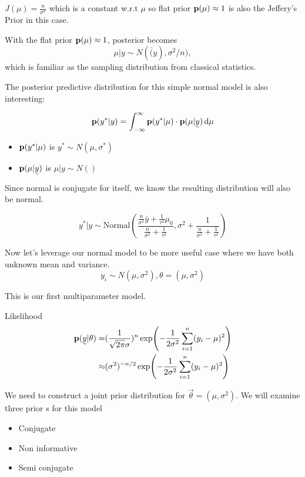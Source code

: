 $J(\mu) = \frac{n}{\sigma^2}$ which is a constant w.r.t $\mu$ so flat prior ${\mathbf p}(\mu) \approx 1$ is also the Jeffery's Prior in this case.

With the flat prior ${\mathbf p}(\mu) \approx 1$, posterior becomes
\[
\mu | y \sim N(\bar(y), \sigma^2/n),
\]
which is familiar as the sampling distribution from classical statistics.

The posterior predictive distribution for this simple normal model is also interesting:

\[
\p(y^*| y) = \int_{-\infty}^{\infty} \p(y^*| \mu) \cdot \p(\mu| \vec{y}) \diff \mu 
\]

\begin{itemize}
    \item ${\mathbf p}(y^*| \mu)$ is $y^* \sim N(\mu, \sigma^*)$
    \item $\p(\mu| \vec{y})$ is $\mu|y \sim N()$
\end{itemize}

Since normal is conjugate for itself, we know the resulting distribution will also be normal.

\[
y^*|y \sim \text{Normal}(
\frac{\frac{n}{\sigma^2} \bar{y} + \frac{1}{\tau^2} \mu_0}{ \frac{n}{\sigma^2} + \frac{1}{\tau^2}},
\sigma^2 + \frac{1}{\frac{n}{\sigma^2} + \frac{1}{\tau^2}})
\]

Now let's leverage our normal model to be more useful case where we have both unknown mean and variance.
\[
y_i \sim N(\mu, \sigma^2), \theta = (\mu, \sigma^2)
\]

This is our first multiparameter model.

Likelihood
\begin{align*}
    \p(\vec{y}| \theta) 
    =& (\frac{1}{\sqrt{2\pi}\sigma})^n \exp(-\frac{1}{2\sigma^2} \sum_{i=1}^n(y_i - \mu)^2)\\
    \approx& (\sigma^2)^{-n/2} \exp(-\frac{1}{2\sigma^2} \sum_{i=1}^n(y_i - \mu)^2)
\end{align*}

We need to construct a joint prior distribution for $\vec{\theta} = (\mu, \sigma^2)$. We will examine three prior s for this model
\begin{itemize}
    \item Conjugate
    \item Non informative
    \item Semi conjugate
\end{itemize}

